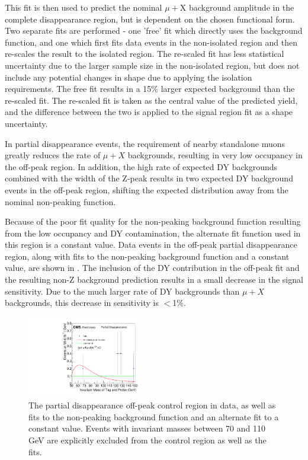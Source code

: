 This fit is then used to predict the nominal $\mu+$X background amplitude in the complete disappearance region, but is dependent on the chosen functional form. 
Two separate fits are performed - one 'free' fit which directly uses the background function, and one which first fits data events in the non-isolated region and then re-scales the result to the isolated region. 
The re-scaled fit has less statistical uncertainty due to the larger sample size in the non-isolated region, but does not include any potential changes in shape due to applying the isolation requirements. 
The free fit results in a 15$\%$ larger expected background than the re-scaled fit. 
The re-scaled fit is taken as the central value of the predicted yield, and the difference between the two is applied to the signal region fit as a shape uncertainty.

In partial disappearance events, the requirement of nearby standalone muons greatly reduces the rate of $\mu+X$ backgrounds, resulting in very low occupancy in the off-peak region. 
In addition, the high rate of expected DY backgrounds combined with the width of the Z-peak results in two expected DY background events in the off-peak region, shifting the expected distribution away from the nominal non-peaking function.

Because of the poor fit quality for the non-peaking background function resulting from the low occupancy and DY contamination, the alternate fit function used in this region is a constant value.
Data events in the off-peak partial disappearance region, along with fits to the non-peaking background function and a constant value, are shown in .
The inclusion of the DY contribution in the off-peak fit and the resulting non-Z background prediction results in a small decrease in the signal sensitivity.
Due to the much larger rate of DY backgrounds than $\mu+X$ backgrounds, this decrease in sensitivity is $<$1$\%$.

\begin{figure}[htp]
    \centering
    \includegraphics[width=0.45\textwidth]{figures/offPeakFitPartialDisappearance.pdf}
     \caption[$\mu$+X background fits in the off-peak control region for partial disappearance events]{The partial disappearance off-peak control region in data, as well as fits to the non-peaking background function and an alternate fit to a constant value. Events with invariant masses between 70 and 110 GeV are explicitly excluded from the control region as well as the fits.}
    \label{fig:offPeakPartialDis}
 \end{figure}

